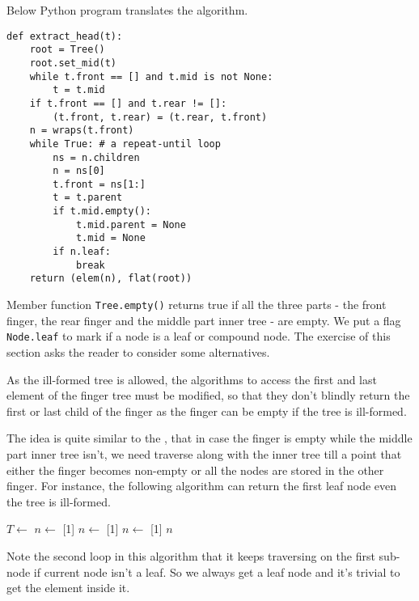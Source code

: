 \documentclass[UTF8]{article}
\begin{document}
Below Python program translates the algorithm.

\lstset{language=Python}
\begin{lstlisting}
def extract_head(t):
    root = Tree()
    root.set_mid(t)
    while t.front == [] and t.mid is not None:
        t = t.mid
    if t.front == [] and t.rear != []:
        (t.front, t.rear) = (t.rear, t.front)
    n = wraps(t.front)
    while True: # a repeat-until loop
        ns = n.children
        n = ns[0]
        t.front = ns[1:]
        t = t.parent
        if t.mid.empty():
            t.mid.parent = None
            t.mid = None
        if n.leaf:
            break
    return (elem(n), flat(root))
\end{lstlisting}

Member function \verb|Tree.empty()| returns true if all the three parts - the front finger,
the rear finger and the middle part inner tree - are empty. We put a flag \verb|Node.leaf|
to mark if a node is a leaf or compound node. The exercise of this section asks the reader
to consider some alternatives.

As the ill-formed tree is allowed, the algorithms to access the first and last element of the
finger tree must be modified, so that they don't blindly return the first or last child
of the finger as the finger can be empty if the tree is ill-formed.

The idea is quite similar to the , that in case the finger is empty
while the middle part inner tree isn't, we need traverse along with the inner tree till a
point that either the finger becomes non-empty or all the nodes are stored in the
other finger. For instance, the following algorithm can return the first leaf node even
the tree is ill-formed.

\begin{algorithmic}
    \State $T \gets$ 
  \EndWhile
    \State $n \gets$ [1]
  \Else
    \State $n \gets$ [1]
  \EndIf
    \State $n \gets$ [1]
  \EndWhile
  \State \Return $n$
\EndFunction
\end{algorithmic}

Note the second loop in this algorithm that it keeps traversing on the first sub-node
if current node isn't a leaf. So we always get a leaf node and it's trivial to get
the element inside it.
\end{document}
